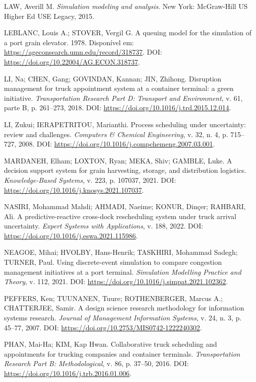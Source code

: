 \documentclass[
  12pt,
  oneside,
  a4paper,
  sumario=tradicional,
  brazil
]{abntex2}
\begin{document}
LAW, Averill M. \textit{Simulation modeling and analysis}. New York: McGraw-Hill US Higher Ed USE Legacy, 2015.

LEBLANC, Louis A.; STOVER, Vergil G. A queuing model for the simulation of a port grain elevator. 1978. Dispon\'ivel em: \url{https://ageconsearch.umn.edu/record/318737}. DOI: \url{https://doi.org/10.22004/AG.ECON.318737}.

LI, Na; CHEN, Gang; GOVINDAN, Kannan; JIN, Zhihong. Disruption management for truck appointment system at a container terminal: a green initiative. \textit{Transportation Research Part D: Transport and Environment}, v. 61, parte B, p. 261--273, 2018. DOI: \url{https://doi.org/10.1016/j.trd.2015.12.014}.

LI, Zukui; IERAPETRITOU, Marianthi. Process scheduling under uncertainty: review and challenges. \textit{Computers \& Chemical Engineering}, v. 32, n. 4, p. 715--727, 2008. DOI: \url{https://doi.org/10.1016/j.compchemeng.2007.03.001}.

MARDANEH, Elham; LOXTON, Ryan; MEKA, Shiv; GAMBLE, Luke. A decision support system for grain harvesting, storage, and distribution logistics. \textit{Knowledge-Based Systems}, v. 223, p. 107037, 2021. DOI: \url{https://doi.org/10.1016/j.knosys.2021.107037}.

NASIRI, Mohammad Mahdi; AHMADI, Naeime; KONUR, Din\c{c}er; RAHBARI, Ali. A predictive-reactive cross-dock rescheduling system under truck arrival uncertainty. \textit{Expert Systems with Applications}, v. 188, 2022. DOI: \url{https://doi.org/10.1016/j.eswa.2021.115986}.

NEAGOE, Mihai; HVOLBY, Hans-Henrik; TASKHIRI, Mohammad Sadegh; TURNER, Paul. Using discrete-event simulation to compare congestion management initiatives at a port terminal. \textit{Simulation Modelling Practice and Theory}, v. 112, 2021. DOI: \url{https://doi.org/10.1016/j.simpat.2021.102362}.

PEFFERS, Ken; TUUNANEN, Tuure; ROTHENBERGER, Marcus A.; CHATTERJEE, Samir. A design science research methodology for information systems research. \textit{Journal of Management Information Systems}, v. 24, n. 3, p. 45--77, 2007. DOI: \url{https://doi.org/10.2753/MIS0742-1222240302}.

PHAN, Mai-Ha; KIM, Kap Hwan. Collaborative truck scheduling and appointments for trucking companies and container terminals. \textit{Transportation Research Part B: Methodological}, v. 86, p. 37--50, 2016. DOI: \url{https://doi.org/10.1016/j.trb.2016.01.006}.
\end{document}
